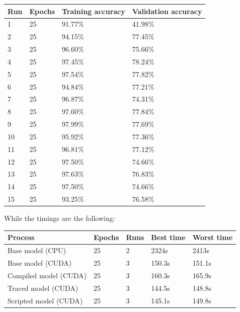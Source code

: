 \documentclass[conference]{IEEEtran}
\begin{document}
\begin{table}[!htbp]
    \centering
    \begin{tabular}{|l|l|l|l|}
    \hline
        Run & Epochs & Training accuracy & Validation accuracy \\ \hline
        1 & 25 & 91.77\% & 41.98\% \\ \hline
        2 & 25 & 94.15\% & 77.45\% \\ \hline
        3 & 25 & 96.60\% & 75.66\% \\ \hline
        4 & 25 & 97.45\% & 78.24\% \\ \hline
        5 & 25 & 97.54\% & 77.82\% \\ \hline
        6 & 25 & 94.84\% & 77.21\% \\ \hline
        7 & 25 & 96.87\% & 74.31\% \\ \hline
        8 & 25 & 97.60\% & 77.84\% \\ \hline
        9 & 25 & 97.99\% & 77.69\% \\ \hline
        10 & 25 & 95.92\% & 77.36\% \\ \hline
        11 & 25 & 96.81\% & 77.12\% \\ \hline
        12 & 25 & 97.50\% & 74.66\% \\ \hline
        13 & 25 & 97.63\% & 76.83\% \\ \hline
        14 & 25 & 97.50\% & 74.66\% \\ \hline
        15 & 25 & 93.25\% & 76.58\% \\ \hline
    \end{tabular}
\end{table}

\FloatBarrier

While the timings are the following:

\begin{table}[!htbp]
    \centering
    \begin{tabular}{|l|l|l|l|l|}
    \hline
        Process & Epochs & Runs & Best time & Worst time \\ \hline
        Base model (CPU) & 25 & 2 & 2324s & 2413s \\ \hline
        Base model (CUDA) & 25 & 3 & 150.3s & 151.1s \\ \hline
        Compiled model (CUDA) & 25 & 3 & 160.3s & 165.9s \\ \hline
        Traced model (CUDA) & 25 & 3 & 144.5s & 148.8s \\ \hline
        Scripted model (CUDA) & 25 & 3 & 145.1s & 149.8s \\ \hline
    \end{tabular}
\end{table}
\end{document}

